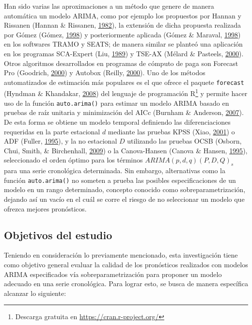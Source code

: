 \documentclass[
]{article}
\begin{document}
Han sido varias las aproximaciones a un método que genere de manera
automática un modelo ARIMA, como por ejemplo los propuestos por Hannan y
Rissanen (Hannan \& Rissanen, \protect\hyperlink{ref-hannan}{1982}), la
extensión de dicha propuesta realizada por Gómez (Gómez,
\protect\hyperlink{ref-gomez}{1998}) y posteriormente aplicada (Gómez \&
Maraval, \protect\hyperlink{ref-tramo}{1998}) en los softwares TRAMO y
SEATS; de manera similar se planteó una aplicación en los programas
SCA-Expert (Liu, \protect\hyperlink{ref-liu}{1989}) y TSE-AX (Mélard \&
Pasteels, \protect\hyperlink{ref-melard}{2000}). Otros algoritmos
desarrollados en programas de cómputo de paga son Forecast Pro
(Goodrich, \protect\hyperlink{ref-forecastpro}{2000}) y Autobox (Reilly,
\protect\hyperlink{ref-autobox}{2000}). Uno de los métodos automatizados
de estimación más populares es el que ofrece el paquete
\texttt{forecast} (Hyndman \& Khandakar,
\protect\hyperlink{ref-auto.arima}{2008}) del lenguaje de programación
R\footnote{Descarga gratuita en \url{https://cran.r-project.org/}} y
permite hacer uso de la función \texttt{auto.arima()} para estimar un
modelo ARIMA basado en pruebas de raíz unitaria y minimización del AICc
(Burnham \& Anderson, \protect\hyperlink{ref-burnham2007model}{2007}).
De esta forma se obtiene un modelo temporal definiendo las
diferenciaciones requeridas en la parte estacional \(d\) mediante las
pruebas KPSS (Xiao,
\protect\hyperlink{ref-doi:10.1111ux2f1467-9892.00213}{2001}) o ADF
(Fuller, \protect\hyperlink{ref-fuller1995introduction}{1995}), y la no
estacional \(D\) utilizando las pruebas OCSB (Osborn, Chui, Smith, \&
Birchenhall, \protect\hyperlink{ref-Osborn2009SEASONALITYAT}{2009}) o la
Canova-Hansen (Canova \& Hansen,
\protect\hyperlink{ref-10.2307ux2f1392184}{1995}), seleccionado el orden
óptimo para los términos \(ARIMA(p, d, q)(P, D, Q)_s\) para una serie
cronológica determinada. Sin embargo, alternativas como la función
\texttt{auto.arima()} no someten a prueba las posibles especificaciones
de un modelo en un rango determinado, concepto conocido como
sobreparametrización, dejando así un vacío en el cuál se corre el riesgo
de no seleccionar un modelo que ofrezca mejores pronósticos.

\subsection{Objetivos del estudio}

Teniendo en consideración lo previamente mencionado, esta investigación
tiene como objetivo general evaluar la calidad de los pronósticos
realizados con modelos ARIMA especificados vía sobreparametrización para
proponer un modelo adecuado en una serie cronológica. Para lograr esto,
se busca de manera específica alcanzar lo siguiente:
\end{document}
